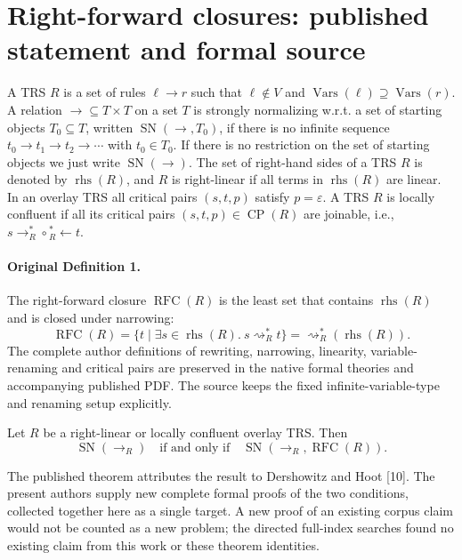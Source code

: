 \section*{Right-forward closures: published statement and formal source}
A TRS $R$ is a set of rules $\ell\to r$ such that $\ell\notin V$ and $\operatorname{Vars}(\ell)\supseteq\operatorname{Vars}(r)$. A relation $\to\subseteq T\times T$ on a set $T$ is strongly normalizing w.r.t. a set of starting objects $T_0\subseteq T$, written $\operatorname{SN}(\to,T_0)$, if there is no infinite sequence $t_0\to t_1\to t_2\to\cdots$ with $t_0\in T_0$. If there is no restriction on the set of starting objects we just write $\operatorname{SN}(\to)$.
The set of right-hand sides of a TRS $R$ is denoted by $\operatorname{rhs}(R)$, and $R$ is right-linear if all terms in $\operatorname{rhs}(R)$ are linear. In an overlay TRS all critical pairs $(s,t,p)$ satisfy $p=\varepsilon$. A TRS $R$ is locally confluent if all its critical pairs $(s,t,p)\in\operatorname{CP}(R)$ are joinable, i.e., $s\to_R^*\circ{}_R^*\!\leftarrow t$.
\paragraph{Original Definition 1.} The right-forward closure $\operatorname{RFC}(R)$ is the least set that contains $\operatorname{rhs}(R)$ and is closed under narrowing:
\[\operatorname{RFC}(R)=\{t\mid\exists s\in\operatorname{rhs}(R).\ s\rightsquigarrow_R^*t\}=\rightsquigarrow_R^*(\operatorname{rhs}(R)).\]
The complete author definitions of rewriting, narrowing, linearity, variable-renaming and critical pairs are preserved in the native formal theories and accompanying published PDF. The source keeps the fixed infinite-variable-type and renaming setup explicitly.
\begin{authortheorem}
Let $R$ be a right-linear or locally confluent overlay TRS. Then
\[\operatorname{SN}(\to_R)\quad\text{if and only if}\quad\operatorname{SN}(\to_R,\operatorname{RFC}(R)).\]
\end{authortheorem}
The published theorem attributes the result to Dershowitz and Hoot [10]. The present authors supply new complete formal proofs of the two conditions, collected together here as a single target. A new proof of an existing corpus claim would not be counted as a new problem; the directed full-index searches found no existing claim from this work or these theorem identities.
